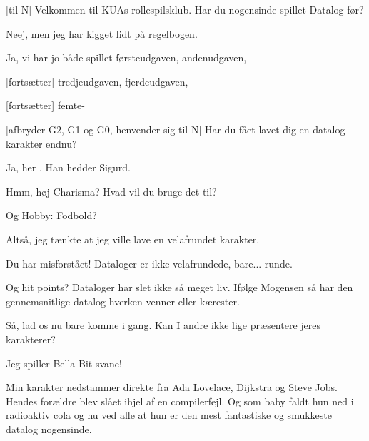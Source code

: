\documentclass[a4paper,11pt]{article}
\begin{document}
\begin{sketch}


[til N] Velkommen til KUAs rollespilsklub.  Har du nogensinde spillet
Datalog før?

 Neej, men jeg har kigget lidt på regelbogen.

 Ja, vi har jo både spillet førsteudgaven, andenudgaven,

[fortsætter] tredjeudgaven, fjerdeudgaven,

[fortsætter] femte-

[afbryder G2, G1 og G0, henvender sig til N] Har du fået lavet dig en
datalog-karakter endnu?

 Ja, her .  Han hedder Sigurd.


 Hmm, høj Charisma?  Hvad vil du bruge det til?

 Og Hobby: Fodbold?

 Altså, jeg tænkte at jeg ville lave en velafrundet karakter.

 Du har misforstået!  Dataloger er ikke velafrundede, bare... runde.

 Og hit points?  Dataloger har slet ikke så meget liv.  Ifølge Mogensen så har den gennemsnitlige datalog hverken
venner eller kærester.

 Så, lad os nu bare komme i gang.  Kan I andre ikke lige præsentere
jeres karakterer?




 Jeg spiller Bella Bit-svane!


 Min karakter nedstammer direkte fra Ada Lovelace, Dijkstra og Steve
Jobs.  Hendes forældre blev slået ihjel af en compilerfejl.  Og som baby faldt
hun ned i radioaktiv cola og nu ved alle at hun er den mest fantastiske og
smukkeste datalog nogensinde.


\end{sketch}
\end{document}
